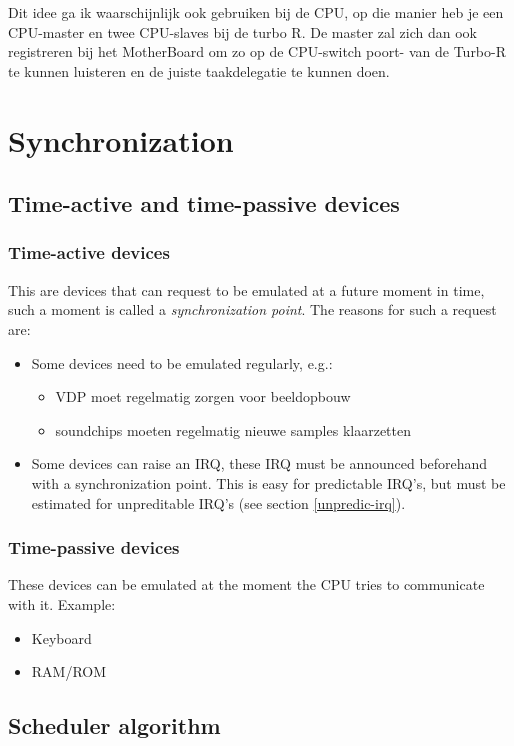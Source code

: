 \documentclass[11pt, a4paper]{report}
\begin{document}
Dit idee ga ik waarschijnlijk ook gebruiken bij de CPU, op die manier heb je een
CPU-master en twee CPU-slaves bij de turbo R. De master zal zich dan ook registreren
bij het MotherBoard om zo op de CPU-switch poort- van de Turbo-R te kunnen luisteren
en de juiste taakdelegatie te kunnen doen.



\section{Synchronization}

\subsection{Time-active and time-passive devices}

\subsubsection{Time-active devices}
This are devices that can request to be emulated at a future moment in time,
such a moment is called a \emph{synchronization point}. The reasons for such a request
are:
\begin{itemize}
\item Some devices need to be emulated regularly, e.g.:
	\begin{itemize}
	\item VDP moet regelmatig zorgen voor beeldopbouw
	\item soundchips moeten regelmatig nieuwe samples klaarzetten
	\end{itemize}
\item Some devices can raise an IRQ, these IRQ must be announced beforehand
with a synchronization point. This is easy for predictable IRQ's, but must be
estimated for unpreditable IRQ's (see section \ref{unpredic-irq}).
\end{itemize}

\subsubsection{Time-passive devices}
These devices can be emulated at the moment the CPU tries to communicate with
it. Example:
\begin{itemize}
\item Keyboard
\item RAM/ROM
\end{itemize}


\subsection{Scheduler algorithm}
\end{document}
